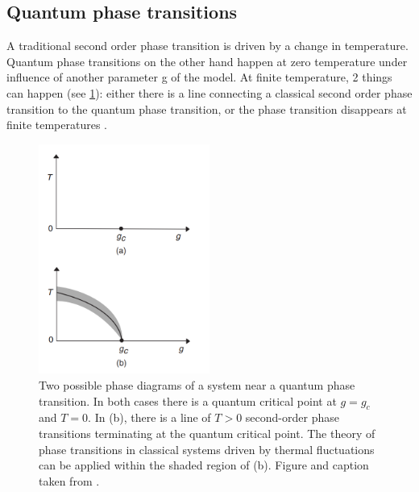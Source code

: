 \subsection{Quantum phase transitions}

A traditional second order phase transition is driven by a change in temperature. Quantum phase transitions on the other hand happen at zero temperature under influence of another parameter g of the model. At finite temperature, 2 things can happen (see \cref{fig:crit:qtran}): either there is a line connecting a classical second order phase transition to the quantum phase transition, or the phase transition disappears at finite temperatures \cite{Sachdev1999}.

\begin{figure}[!htbp]
    \center
    \includegraphics[width=0.5\textwidth]{Figuren/crit/Screenshot from 2021-05-06 15-58-55.png}
    \caption{ Two possible phase diagrams of a system near a quantum phase transition. In both cases there is a quantum critical point at $g = g_c$ and $T = 0$. In (b), there is a line of $T > 0$ second-order phase transitions terminating at the quantum critical point. The theory of phase transitions in classical systems driven by thermal fluctuations can be applied within the shaded region of (b).  Figure and caption taken from \cite{Sachdev1999}. }
    \label{fig:crit:qtran}
\end{figure}

